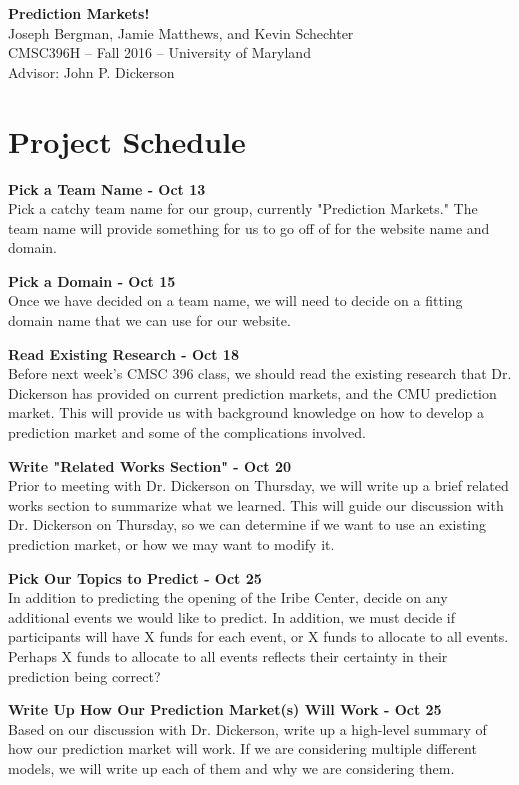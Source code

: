 \documentclass[12pt]{article}
\begin{document}
\begin{center}
{\Large \textbf{Prediction Markets!}}\\
Joseph Bergman, Jamie Matthews, and Kevin Schechter\\
CMSC396H -- Fall 2016 -- University of Maryland\\
Advisor: John P. Dickerson
\end{center}

\section*{Project Schedule}

\noindent
\textbf{Pick a Team Name - Oct 13} \\
Pick a catchy team name for our group, currently "Prediction Markets." The team name will provide something for us to go off of for the website name and domain. 

\noindent
\textbf{Pick a Domain - Oct 15} \\
Once we have decided on a team name, we will need to decide on a fitting domain name that we can use for our website.

\noindent
\textbf{Read Existing Research - Oct 18} \\
Before next week's CMSC 396 class, we should read the existing research that Dr. Dickerson has provided on current prediction markets, and the CMU prediction market. This will provide us with background knowledge on how to develop a prediction market and some of the complications involved.

\noindent
\textbf{Write "Related Works Section" - Oct 20} \\
Prior to meeting with Dr. Dickerson on Thursday, we will write up a brief related works section to summarize what we learned. This will guide our discussion with Dr. Dickerson on Thursday, so we can determine if we want to use an existing prediction market, or how we may want to modify it. 

\noindent
\textbf{Pick Our Topics to Predict - Oct 25} \\
In addition to predicting the opening of the Iribe Center, decide on any additional events we would like to predict. In addition, we must decide if participants will have X funds for each event, or X funds to allocate to all events. Perhaps X funds to allocate to all events reflects their certainty in their prediction being correct?  

\noindent
\textbf{Write Up How Our Prediction Market(s) Will Work - Oct 25} \\
Based on our discussion with Dr. Dickerson, write up a high-level summary of how our prediction market will work. If we are considering multiple different models, we will write up each of them and why we are considering them.  
\end{document}
